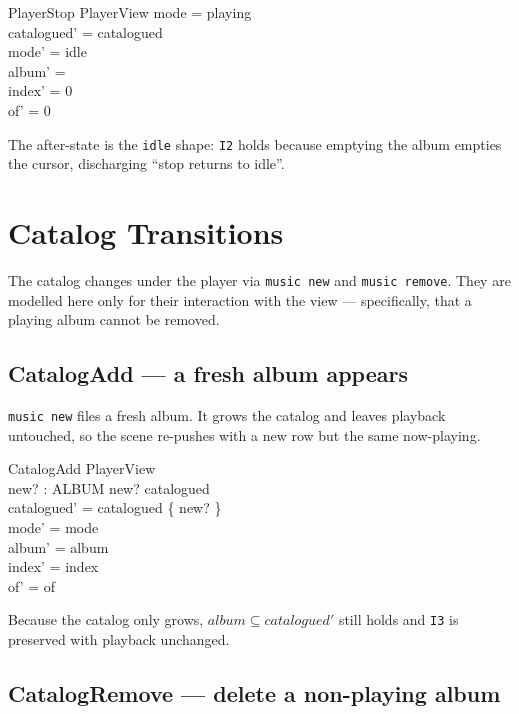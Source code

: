 \documentclass[a4paper,10pt,fleqn]{article}
\begin{document}
\begin{schema}{PlayerStop}
  \Delta PlayerView
  \where
  mode = playing \\
  catalogued' = catalogued \\
  mode' = idle \\
  album' = \emptyset \\
  index' = 0 \\
  of' = 0
\end{schema}

The after-state is the \texttt{idle} shape: \texttt{I2} holds because emptying
the album empties the cursor, discharging ``stop returns to idle''.

\section{Catalog Transitions}

The catalog changes under the player via \texttt{music new} and \texttt{music
remove}. They are modelled here only for their interaction with the view ---
specifically, that a playing album cannot be removed.

\subsection{CatalogAdd --- a fresh album appears}

\texttt{music new} files a fresh album. It grows the catalog and leaves playback
untouched, so the scene re-pushes with a new row but the same now-playing.

\begin{schema}{CatalogAdd}
  \Delta PlayerView \\
  new? : ALBUM
  \where
  new? \notin catalogued \\
  catalogued' = catalogued \cup \{ new? \} \\
  mode' = mode \\
  album' = album \\
  index' = index \\
  of' = of
\end{schema}

Because the catalog only grows, $album \subseteq catalogued'$ still holds and
\texttt{I3} is preserved with playback unchanged.

\subsection{CatalogRemove --- delete a non-playing album}
\end{document}

